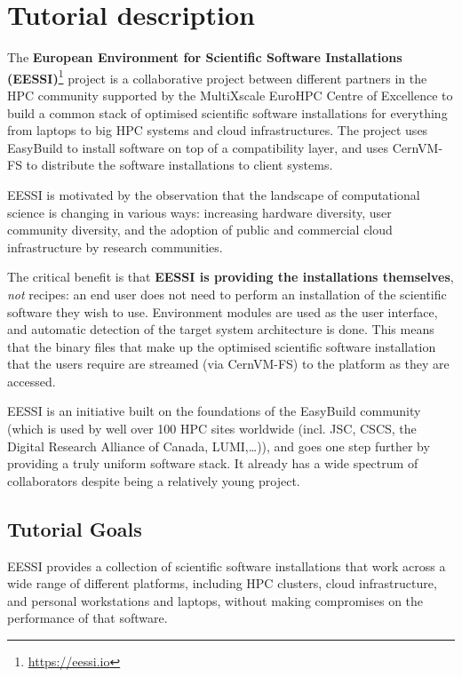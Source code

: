 \section*{Tutorial description}

The \textbf{European Environment for Scientific Software Installations
(EESSI)}\footnote{\href{https://eessi.io}{https://eessi.io}} project is a collaborative project
between different partners in the HPC community supported by the MultiXscale EuroHPC Centre of Excellence to build a
common stack of optimised scientific software installations for everything from laptops to big HPC systems and cloud
infrastructures.
The project uses EasyBuild to install software on top of a compatibility layer, and uses CernVM-FS to
distribute the software installations to client systems.

EESSI is motivated by the observation that the landscape of computational science is changing in
various ways: increasing hardware diversity, user community diversity, and the adoption of public and commercial cloud
infrastructure by research communities.

The critical benefit is that \textbf{EESSI is providing the
installations themselves}, \textit{not} recipes: an end user does not need to perform an installation
of the scientific software they wish to use.
Environment modules are used as the user interface, and automatic
detection of the target system architecture is done.
This means that the binary files that make up the optimised
scientific software installation that the users require are streamed (via CernVM-FS) to the platform as they are accessed.

EESSI is an initiative built on the foundations of the EasyBuild community (which is used by well over
100 HPC sites worldwide (incl. JSC, CSCS, the Digital Research Alliance of Canada, LUMI,\ldots)), and goes one
step further by providing a truly uniform software stack.
It already has a wide spectrum of collaborators despite being a relatively young project.

\subsection*{Tutorial Goals}

EESSI provides a collection of scientific software installations that work across a wide range of
different platforms, including HPC clusters, cloud infrastructure, and personal workstations and laptops, without making
compromises on the performance of that software.

